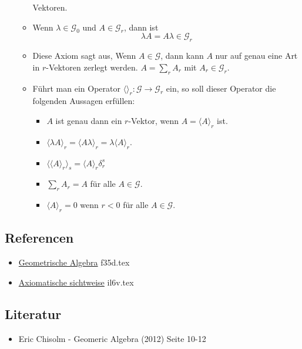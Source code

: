 \documentclass{sajzk}
\begin{document}
\begin{itemize}
\begin{itemize}
              Vektoren.
        \item Wenn $\lambda\in\mathscr{G}_0$ und $A\in\mathscr{G}_r$,
              dann ist
          $$\lambda A=A\lambda\in\mathscr{G}_r$$
        \item Diese Axiom sagt aus, Wenn $A\in\mathscr{G}$, dann kann $A$ nur auf genau
              eine Art in $r$-Vektoren zerlegt werden. $A=\sum_r A_r$ mit
              $A_r\in\mathscr{G}_r$.
        \item Führt man ein Operator $\langle \rangle_r:\mathscr{G}\to\mathscr{G}_r$ ein,
              so soll dieser Operator die folgenden Aussagen erfüllen:
        \begin{itemize}
            \item $A$ ist genau dann ein $r$-Vektor, wenn $A = \langle A\rangle_r$ ist.
            \item $\langle\lambda A\rangle_r=\langle A\lambda\rangle_r=\lambda\langle A\rangle_r$.
            \item $\langle\langle A\rangle_r\rangle_s = \langle A\rangle_r\delta_r^s$
            \item $\sum_r A_r = A$ für alle $A\in\mathscr{G}$.
            \item $\langle A\rangle_r = 0$ wenn $r<0$ für alle $A\in\mathscr{G}$.
        \end{itemize}
    \end{itemize}
\end{itemize}

\subsection{Referencen}
\begin{itemize}
    \item \href{f35d.pdf}{Geometrische Algebra} f35d.tex
    \item \href{il6v.pdf}{Axiomatische sichtweise} il6v.tex
\end{itemize}

\subsection{Literatur}
\begin{itemize}
    \item Eric Chisolm - Geomeric Algebra (2012) Seite 10-12
\end{itemize}
\end{document}
